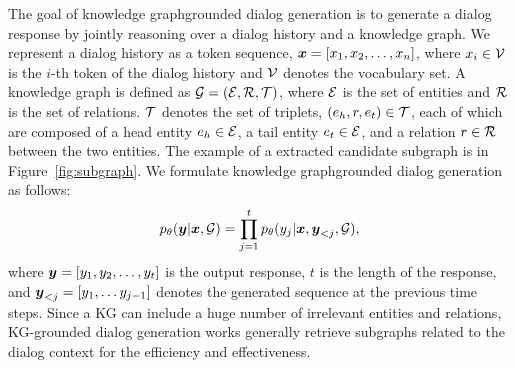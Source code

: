 The goal of knowledge graph{\textendash}grounded dialog generation is to generate a dialog response by jointly reasoning over a dialog history and a knowledge graph.
We represent a dialog history as a token sequence, $\boldsymbol{x} = \left[x_1, x_2, \dots, x_{n} \right]$, where $x_i \in \mathcal{V}$ is the $i$-th token of the dialog history and $\mathcal{V}$ denotes the vocabulary set.
A knowledge graph is defined as $\mathcal{G} = \left(\mathcal{E}, \mathcal{R}, \mathcal{T} \right)$, where $\mathcal{E}$ is the set of entities and $\mathcal{R}$ is the set of relations.
$\mathcal{T}$ denotes the set of triplets, $(e_h, r, e_t) \in \mathcal{T}$, each of which are composed of a head entity $e_h \in \mathcal{E}$, a tail entity $e_t \in \mathcal{E}$, and a relation $r \in \mathcal{R}$ between the two entities.
The example of a extracted candidate subgraph is in Figure~\ref{fig:subgraph}.
We formulate knowledge graph{\textendash}grounded dialog generation as follows:
\begin{equation}
\label{eq:problem}
    p_{\theta}(\boldsymbol{y} |\boldsymbol{x}, \mathcal{G}) = \prod_{j=1}^t p_{\theta}(y_j | \boldsymbol{x}, \boldsymbol{y}_{<j}, \mathcal{G}),
\end{equation}
where $\boldsymbol{y}=\left[y_1, y_2, \dots, y_t \right]$ is the output response, $t$ is the length of the response, and $\boldsymbol{y}_{<j}=\left[y_1, \dots y_{j-1} \right]$ denotes the generated sequence at the previous time steps. %
Since a KG can include a huge number of irrelevant entities and relations, KG-grounded dialog generation works generally retrieve subgraphs related to the dialog context for the efficiency and effectiveness.
